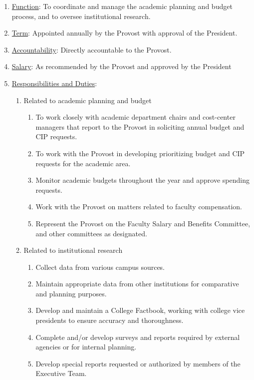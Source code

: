 					\begin{enumerate}
						\item{\underline{Function}:  To coordinate and manage the academic planning and budget process, and to oversee institutional research.}
						\item{\underline{Term}:  Appointed annually by the Provost with approval of the President.}
						\item{\underline{Accountability}:  Directly accountable to the Provost.}
						\item{\underline{Salary}:  As recommended by the Provost and approved by the President}
						\item{\underline{Responsibilities and Duties}:
							\begin{enumerate}
								\item{Related to academic planning and budget
									\begin{enumerate}
										\item{To work closely with academic department chairs and cost-center managers that report to the Provost in soliciting annual budget and CIP requests.}
										\item{To work with the Provost in developing prioritizing budget and CIP requests for the academic area.}
										\item{Monitor academic budgets throughout the year and approve spending requests.}
										\item{Work with the Provost on matters related to faculty compensation.}
										\item{Represent the Provost on the Faculty Salary and Benefits Committee, and other committees as designated.}
									\end{enumerate}
								}
								\item{Related to institutional research
									\begin{enumerate}
										\item{Collect data from various campus sources.}
										\item{Maintain appropriate data from other institutions for comparative and planning purposes.}
										\item{Develop and maintain a College Factbook, working with college vice presidents to ensure accuracy and thoroughness.}
										\item{Complete and/or develop surveys and reports required by external agencies or for internal planning.}
										\item{Develop special reports requested or authorized by members of the Executive Team.}
									\end{enumerate}
								}
							\end{enumerate}
						}
					\end{enumerate}
